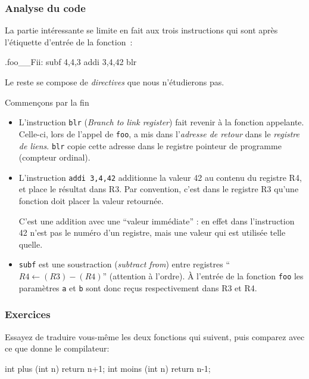 \documentclass[10pt,twoside,a4paper]{article}
\begin{document}
\begin{multicols}{2}
\subsubsection{Analyse du code}

La partie intéressante se limite en fait aux trois instructions 
qui sont après l'étiquette d'entrée de la fonction~:

\begin{center}
\begin{boxedverbatim}
.foo__Fii:
        subf 4,4,3
        addi 3,4,42
        blr
\end{boxedverbatim}
\end{center}

Le reste se compose de \emph{directives} que nous n'étudierons pas.

Commençons par la fin
\begin{itemize}
\item L'instruction \texttt{blr} (\emph{Branch to link register}) fait revenir à
la fonction appelante. Celle-ci, lors de l'appel de \texttt{foo},
a mis dans l'\emph{adresse de retour} dans le \emph{registre de liens}.
\texttt{blr} copie cette adresse dans le registre pointeur de programme
(compteur ordinal).
\item L'instruction \texttt{addi 3,4,42} additionne la valeur 42 au
contenu du registre R4, et place le résultat dans R3. Par convention,
c'est dans le registre R3 qu'une fonction doit placer la valeur
retournée.

C'est une addition avec une ``valeur immédiate'' : en effet dans 
l'instruction 42 n'est pas le numéro d'un registre, mais une valeur qui
est utilisée telle quelle.

\item \texttt{subf} est une soustraction (\emph{subtract from})  entre registres
``$R4 \leftarrow (R3) - (R4)$'' (attention à l'ordre). À l'entrée de
la fonction \texttt{foo} les paramètres
\texttt{a} et \texttt{b} sont donc reçus respectivement dans R3 et R4.
\end{itemize}

\subsubsection{Exercices}

Essayez de traduire vous-même les deux fonctions qui suivent, puis 
comparez avec ce que donne le compilateur:

\begin{center}
\begin{boxedverbatim}
int plus  (int n) { return n+1; }
int moins (int n) { return n-1; }
\end{boxedverbatim}
\end{center}


\end{multicols}
\end{document}
